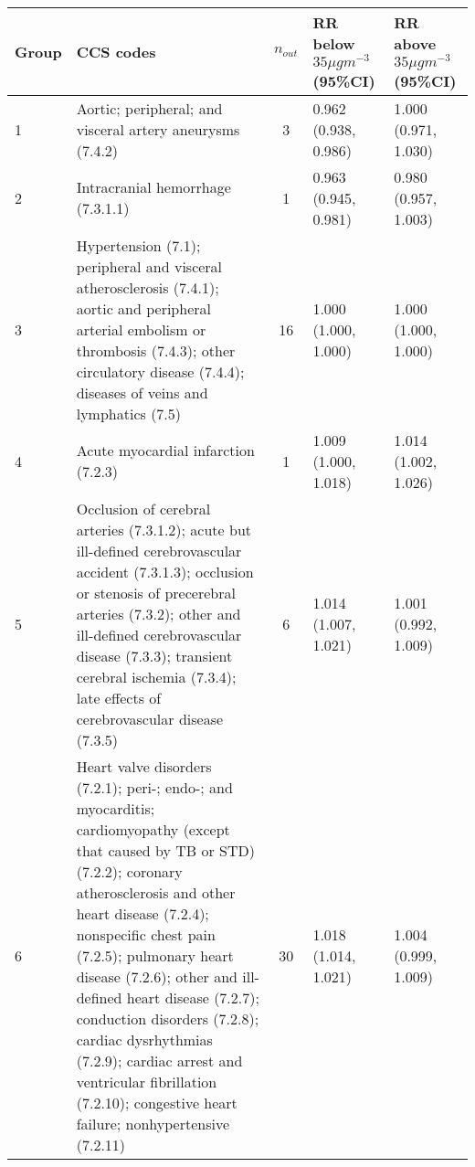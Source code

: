 \begin{tabular}{lp{7.8cm}cp{2.2cm}p{2.2cm}}
  \hline
Group & CCS codes & $n_{out}$ & RR below $35 \mu g m^{-3}$ (95\%CI) & RR above $35 \mu g m^{-3}$ (95\%CI) \\ 
  \hline
   1 & Aortic; peripheral; and visceral artery aneurysms (7.4.2) &    3 & 0.962 (0.938, 0.986) & 1.000 (0.971, 1.030) \\ 
     2 & Intracranial hemorrhage (7.3.1.1) &    1 & 0.963 (0.945, 0.981) & 0.980 (0.957, 1.003) \\ 
     3 & Hypertension (7.1); peripheral and visceral atherosclerosis (7.4.1); aortic and peripheral arterial embolism or thrombosis (7.4.3); other circulatory disease (7.4.4); diseases of veins and lymphatics (7.5) &   16 & 1.000 (1.000, 1.000) & 1.000 (1.000, 1.000) \\ 
     4 & Acute myocardial infarction (7.2.3) &    1 & 1.009 (1.000, 1.018) & 1.014 (1.002, 1.026) \\ 
     5 & Occlusion of cerebral arteries (7.3.1.2); acute but ill-defined cerebrovascular accident (7.3.1.3); occlusion or stenosis of precerebral arteries (7.3.2); other and ill-defined cerebrovascular disease (7.3.3); transient cerebral ischemia (7.3.4); late effects of cerebrovascular disease (7.3.5) &    6 & 1.014 (1.007, 1.021) & 1.001 (0.992, 1.009) \\ 
     6 & Heart valve disorders (7.2.1); peri-; endo-; and myocarditis; cardiomyopathy (except that caused by TB or STD) (7.2.2); coronary atherosclerosis and other heart disease (7.2.4); nonspecific chest pain (7.2.5); pulmonary heart disease (7.2.6); other and ill-defined heart disease (7.2.7); conduction disorders (7.2.8); cardiac dysrhythmias (7.2.9); cardiac arrest and ventricular fibrillation (7.2.10); congestive heart failure; nonhypertensive (7.2.11) &   30 & 1.018 (1.014, 1.021) & 1.004 (0.999, 1.009) \\ 
   \hline
\end{tabular}

